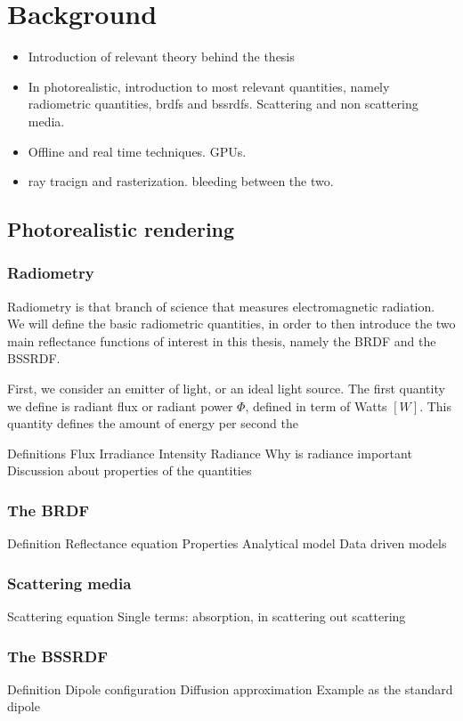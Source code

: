 \chapter{Background}
\begin{itemize}
\item Introduction of relevant theory behind the thesis
\item In photorealistic, introduction to most relevant quantities, namely radiometric quantities, brdfs and bssrdfs. Scattering and non scattering media.
\item Offline and real time techniques. GPUs. 
\item ray tracign and rasterization. bleeding between the two.
\end{itemize}

\section{Photorealistic rendering}

\subsection{Radiometry}
Radiometry is that branch of science that measures electromagnetic radiation. We will define the basic radiometric quantities, in order to then introduce the two main reflectance functions of interest in this thesis, namely the BRDF and the BSSRDF. 

First, we consider an emitter of light, or an ideal light source.
The first quantity we define is radiant flux or radiant power $\Phi$, defined in term of Watts $[W]$. This quantity defines the amount of energy per second the 

Definitions
Flux
Irradiance
Intensity 
Radiance
Why is radiance important
Discussion about properties of the quantities

\subsection{The BRDF}
Definition
Reflectance equation
Properties
Analytical model
Data driven models

\subsection{Scattering media}
Scattering equation
Single terms: absorption, in scattering out scattering

\subsection{The BSSRDF}
Definition
Dipole configuration
Diffusion approximation
Example as the standard dipole

